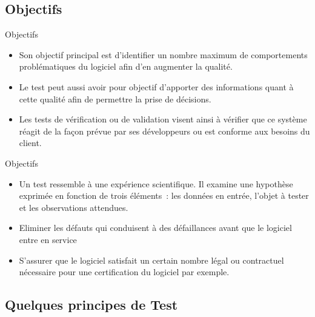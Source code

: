 \documentclass{beamer}
\begin{document}
\subsection{Objectifs}

\begin{frame}{Objectifs}

  \begin{itemize}
    
  \item{Son objectif principal est d'identifier un nombre maximum de comportements problématiques du logiciel afin d'en augmenter la qualité.\pause}
  \item{Le test peut aussi avoir pour objectif d'apporter des informations quant à cette qualité afin de permettre la prise de décisions.\pause}
  \item{Les tests de vérification ou de validation visent ainsi à vérifier que ce système réagit de la façon prévue par ses développeurs ou est conforme aux besoins du client.
}
 \end{itemize}   
\end{frame}

\begin{frame}{Objectifs}

  \begin{itemize}

  \item{Un test ressemble à une expérience scientifique. Il examine une hypothèse exprimée en fonction de trois éléments : les données en entrée, l'objet à tester et les observations attendues. \pause}

 
  \item{Eliminer les défauts qui conduisent à des défaillances avant que le logiciel entre en service}
  \item{S'assurer que le logiciel satisfait un certain nombre légal ou contractuel nécessaire pour une certification du logiciel par exemple.}
    
  \end{itemize}   
\end{frame}

\subsection{Quelques principes de Test}
\end{document}
